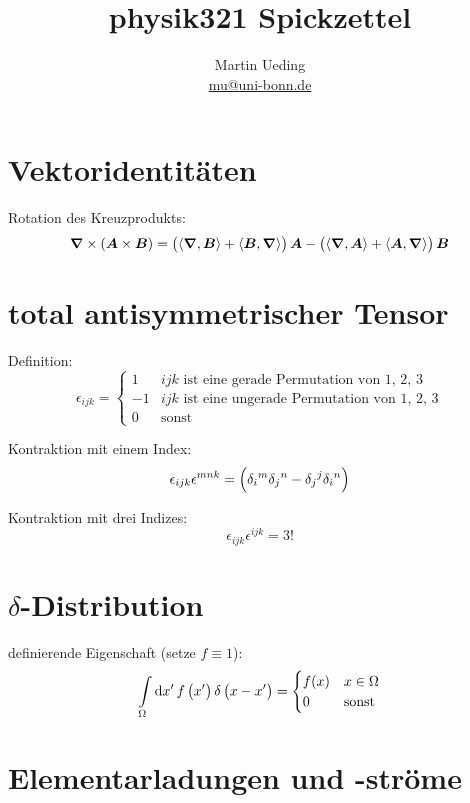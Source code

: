 

\hypersetup{
	pdftitle=
}


\title{physik321 Spickzettel}
\author{
	Martin Ueding \\
	\small{\href{mailto:mu@uni-bonn.de}{mu@uni-bonn.de}}
}



\section{Vektoridentitäten}

Rotation des Kreuzprodukts:
\[
	\vnabla \times \del{\vec A \times \vec B}
	= \del{\divergence{\vec B} + \inner{\vec B}\vnabla} \vec A
	- \del{\divergence{\vec A} + \inner{\vec A}\vnabla} \vec B
\]


\section{total antisymmetrischer Tensor}

Definition:
\[
	\epsilon_{ijk}
	=
	\begin{cases}
		1 & \text{$ijk$ ist eine gerade Permutation von 1, 2, 3} \\
		-1 & \text{$ijk$ ist eine ungerade Permutation von 1, 2, 3} \\
		0 & \text{sonst}
	\end{cases}
\]

Kontraktion mit einem Index:
\[
	\epsilon_{ijk} \epsilon^{mnk} = \del{
		\delta_i{}^m \delta_j{}^n - \delta_j{}^j \delta_i{}^n
	}
\]

Kontraktion mit drei Indizes:
\[
	\epsilon_{ijk} \epsilon^{ijk} = 3!
\]

\section{$\delta$-Distribution}

definierende Eigenschaft (setze $f \equiv 1$):
\[
	\intop_\Omega \dif x' \, f\del{x'} \delta\del{x - x'}
	=
	\begin{cases}
		f(x) & x \in \Omega \\
		0 & \text{sonst}
	\end{cases}
\]

\section{Elementarladungen und -ströme}

